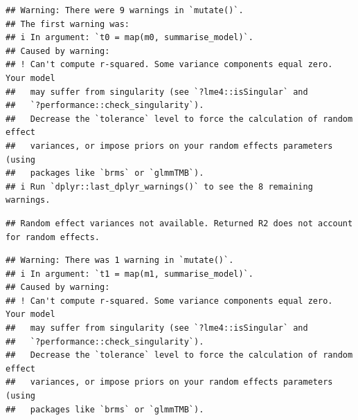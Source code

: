 \documentclass[
  10pt,
]{article}
\begin{document}
\begin{verbatim}
## Warning: There were 9 warnings in `mutate()`.
## The first warning was:
## i In argument: `t0 = map(m0, summarise_model)`.
## Caused by warning:
## ! Can't compute r-squared. Some variance components equal zero. Your model
##   may suffer from singularity (see `?lme4::isSingular` and
##   `?performance::check_singularity`).
##   Decrease the `tolerance` level to force the calculation of random effect
##   variances, or impose priors on your random effects parameters (using
##   packages like `brms` or `glmmTMB`).
## i Run `dplyr::last_dplyr_warnings()` to see the 8 remaining warnings.
\end{verbatim}

\begin{verbatim}
## Random effect variances not available. Returned R2 does not account for random effects.
\end{verbatim}

\begin{verbatim}
## Warning: There was 1 warning in `mutate()`.
## i In argument: `t1 = map(m1, summarise_model)`.
## Caused by warning:
## ! Can't compute r-squared. Some variance components equal zero. Your model
##   may suffer from singularity (see `?lme4::isSingular` and
##   `?performance::check_singularity`).
##   Decrease the `tolerance` level to force the calculation of random effect
##   variances, or impose priors on your random effects parameters (using
##   packages like `brms` or `glmmTMB`).
\end{verbatim}
\end{document}
